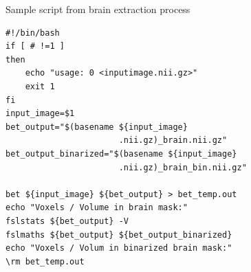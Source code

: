 \documentclass[a4paper,num-refs]{oup-contemporary}
\begin{document}
\begin{algorithm}[h!]
\caption{Sample script from brain extraction process}
\label{algo:sample-script}
\begin{verbatim}
#!/bin/bash
if [ # !=1 ]
then
    echo "usage: 0 <inputimage.nii.gz>"
    exit 1
fi
input_image=$1
bet_output="$(basename ${input_image} 
                       .nii.gz)_brain.nii.gz"
bet_output_binarized="$(basename ${input_image} 
                       .nii.gz)_brain_bin.nii.gz"

bet ${input_image} ${bet_output} > bet_temp.out
echo "Voxels / Volume in brain mask:"
fslstats ${bet_output} -V
fslmaths ${bet_output} ${bet_output_binarized}
echo "Voxels / Volum in binarized brain mask:"
\rm bet_temp.out
\end{verbatim}
\end{algorithm}
\end{document}

